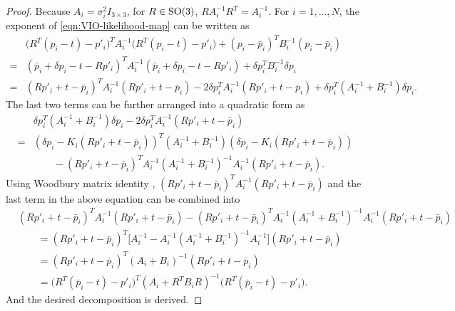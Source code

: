 \begin{proof}
	Because $A_i = \sigma_i^2I_{3\times 3}$, for $R\in\mathrm{SO}(3)$, $RA_i^{-1}R^T = A_i^{-1}$.
	For $i=1,\ldots,N$, the exponent of \eqref{eqn:VIO-likelihood-map} can be written as
	\begin{align*}
		&\big(R^T(p_i-t)-p'_i\big)^T A_i^{-1} \big(R^T(p_i-t)-p'_i\big) + (p_i-\bar{p}_i)^T B_i^{-1} (p_i-\bar{p}_i) \\
		= &(\bar{p}_i+\delta p_i - t - Rp'_i)^T A_i^{-1} (\bar{p}_i+\delta p_i - t - Rp'_i) + \delta p_i^T B_i^{-1} \delta p_i \\
		= &(Rp'_i+t-\bar{p}_i)^T A_i^{-1} (Rp'_i+t-\bar{p}_i) - 2\delta p_i^T A_i^{-1} (Rp'_i+t-\bar{p}_i) + \delta p_i^T (A_i^{-1}+B_i^{-1}) \delta p_i.
	\end{align*}
	The last two terms can be further arranged into a quadratic form as
	\begin{align*}
		&\delta p_i^T (A_i^{-1}+B_i^{-1}) \delta p_i - 2\delta p_i^T A_i^{-1} (Rp'_i+t-\bar{p}_i) \\
		= &\left( \delta p_i - K_i(Rp'_i+t-\bar{p}_i) \right)^T (A_i^{-1}+B_i^{-1}) \left( \delta p_i - K_i(Rp'_i+t-\bar{p}_i) \right) \\
		&\qquad - (Rp'_i+t-\bar{p}_i)^T A_i^{-1} (A_i^{-1}+B_i^{-1})^{-1} A_i^{-1} (Rp'_i+t-\bar{p}_i).
	\end{align*}
	Using Woodbury matrix identity \cite{petersen2008matrix}, $(Rp'_i+t-\bar{p}_i)^T A_i^{-1} (Rp'_i+t-\bar{p}_i)$ and the last term in the above equation can be combined into
	\begin{align*}
		&(Rp'_i+t-\bar{p}_i)^T A_i^{-1} (Rp'_i+t-\bar{p}_i) - (Rp'_i+t-\bar{p}_i)^T A_i^{-1} (A_i^{-1}+B_i^{-1})^{-1} A_i^{-1} (Rp'_i+t-\bar{p}_i) \\
		&\qquad = (Rp'_i+t-\bar{p}_i)^T \Big[ A_i^{-1} - A_i^{-1} (A_i^{-1}+B_i^{-1})^{-1} A_i^{-1} \Big] (Rp'_i+t-\bar{p}_i) \\
		&\qquad = (Rp'_i+t-\bar{p}_i)^T (A_i+B_i)^{-1} (Rp'_i+t-\bar{p}_i) \\
		&\qquad = \big(R^T(\bar{p}_i-t)-p'_i\big)^T (A_i+R^TB_iR)^{-1} \big(R^T(\bar{p}_i-t)-p'_i\big).
	\end{align*}
	And the desired decomposition is derived.
\end{proof}

